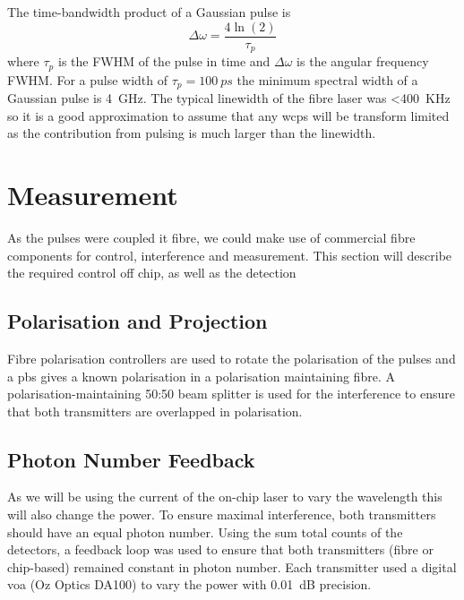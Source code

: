 The time-bandwidth product of a Gaussian pulse is
\begin{equation}
	\Delta \omega = \frac{4 \ln(2)}{\tau_p}
\end{equation}
where $\tau_p$ is the \ac{FWHM} of the pulse in time and $\Delta \omega$ is the angular frequency \ac{FWHM}. For a pulse width of $\tau_p = \SI{100}{ps}$ the minimum spectral width of a Gaussian pulse is \SI{4}{GHz}. The typical linewidth of the fibre laser was \SI{<400}{KHz} so it is a good approximation to assume that any \acp{wcp} will be transform limited as the contribution from pulsing is much larger than the linewidth.

\section{Measurement}



As the pulses were coupled it fibre, we could make use of commercial fibre components for control, interference and measurement. This section will describe the required control off chip, as well as the detection 

\subsection{Polarisation and Projection}

Fibre polarisation controllers are used to rotate the polarisation of the pulses and a \ac{pbs} gives a known polarisation in a polarisation maintaining fibre. A polarisation-maintaining {50:50} beam splitter is used for the interference to ensure that both transmitters are overlapped in polarisation.

\subsection{Photon Number Feedback}

As we will be using the current of the on-chip laser to vary the wavelength this will also change the power. To ensure maximal interference, both transmitters should have an equal photon number. Using the sum total counts of the detectors, a feedback loop was used to ensure that both transmitters (fibre or chip-based) remained constant in photon number. Each transmitter used a digital \ac{voa} (Oz Optics DA100) to vary the power with \SI{0.01}{dB} precision.

